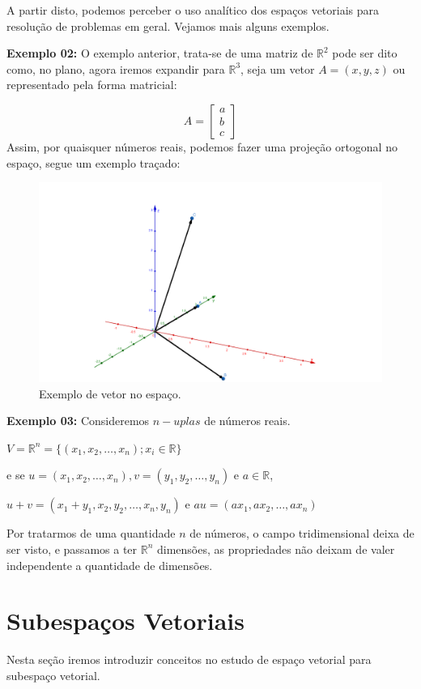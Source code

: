 A partir disto, podemos perceber o uso analítico dos espaços vetoriais para resolução de problemas em geral. Vejamos mais alguns exemplos.

\noindent\textbf{Exemplo 02:} O exemplo anterior, trata-se de uma matriz de $\mathbb{R}^2$ pode ser dito como, no plano, agora iremos expandir para $\mathbb{R}^3$, seja um vetor $A = (x, y, z)$ ou representado pela forma matricial:

\[
A = \begin{bmatrix}
	a \\ b \\ c
\end{bmatrix}
\]
\noindent Assim, por quaisquer números reais, podemos fazer uma projeção ortogonal no espaço, segue um exemplo traçado:

\begin{figure}[H]
	\centering
	\includegraphics[scale=0.30]{exemplo02.png}
	\caption{Exemplo de vetor no espaço.}
\end{figure}

\noindent\textbf{Exemplo 03:} Consideremos $n-uplas$ de números reais.

$V = \mathbb{R}^n = \{(x_1, x_2, \ldots, x_n); x_i \in \mathbb{R}\}$

e se $u = (x_1, x_2, \ldots, x_n), v = (y_1, y_2, \ldots, y_n)$ e $a \in \mathbb{R}$,

$u + v = (x_1 + y_1, x_2, y_2, \ldots, x_n, y_n)$ e $au = (ax_1, ax_2, \ldots, ax_n)$

Por tratarmos de uma quantidade $n$ de números, o campo tridimensional deixa de ser visto, e passamos a ter $\mathbb{R}^n$ dimensões, as propriedades não deixam de valer independente a quantidade de dimensões.

\section{Subespaços Vetoriais}
Nesta seção iremos introduzir conceitos no estudo de espaço vetorial para subespaço vetorial.


